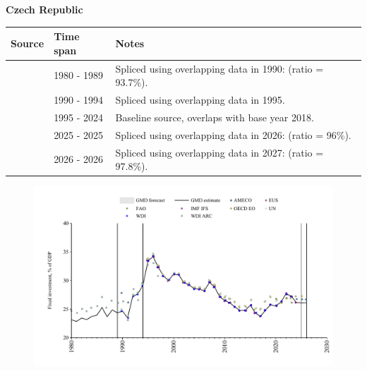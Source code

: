 \documentclass[12pt,a4paper,landscape]{article}
\begin{document}
\begin{adjustbox}{max totalsize={\paperwidth}{\paperheight},center}
\begin{minipage}[t][\textheight][t]{\textwidth}
\vspace*{0.5cm}
{}
\begin{center}
{\Large\bfseries Czech Republic}
\end{center}
\vspace{0.5cm}
\begin{table}[H]
\centering
\small
\begin{tabular}{|l|l|l|}
\hline
\textbf{Source} & \textbf{Time span} & \textbf{Notes} \\
\hline
\rowcolor{white}\cite{WDI_ARC}& 1980 - 1989 &Spliced using overlapping data in 1990: (ratio = 93.7\%).\\
\rowcolor{lightgray}\cite{WDI}& 1990 - 1994 &Spliced using overlapping data in 1995.\\
\rowcolor{white}\cite{EUS}& 1995 - 2024 &Baseline source, overlaps with base year 2018.\\
\rowcolor{lightgray}\cite{OECD_EO}& 2025 - 2025 &Spliced using overlapping data in 2026: (ratio = 96\%).\\
\rowcolor{white}\cite{AMECO}& 2026 - 2026 &Spliced using overlapping data in 2027: (ratio = 97.8\%).\\
\hline
\end{tabular}
\end{table}
\begin{figure}[H]
\centering
\includegraphics[width=\textwidth,height=0.6\textheight,keepaspectratio]{graphs/CZE_finv_GDP.pdf}
\end{figure}
\end{minipage}
\end{adjustbox}
\end{document}

